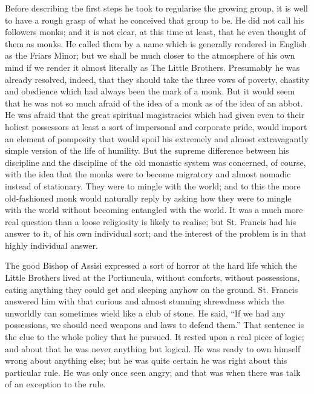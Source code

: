 \documentclass{book}
\begin{document}
Before describing the first steps he took to regularise the growing group, it is well to have a rough grasp of what he conceived that group to be. He did not call his followers monks; and it is not clear, at this time at least, that he even thought of them as monks. He called them by a name which is generally rendered in English as the Friars Minor; but we shall be much closer to the atmosphere of his own mind if we render it almost literally as The Little Brothers. Presumably he was already resolved, indeed, that they should take the three vows of poverty, chastity and obedience which had always been the mark of a monk. But it would seem that he was not so much afraid of the idea of a monk as of the idea of an abbot. He was afraid that the great spiritual magistracies which had given even to their holiest possessors at least a sort of impersonal and corporate pride, would import an element of pomposity that would spoil his extremely and almost extravagantly simple version of the life of humility. But the supreme difference between his discipline and the discipline of the old monastic system was concerned, of course, with the idea that the monks were to become migratory and almost nomadic instead of stationary. They were to mingle with the world; and to this the more old-fashioned monk would naturally reply by asking how they were to mingle with the world without becoming entangled with the world. It was a much more real question than a loose religiosity is likely to realise; but St. Francis had his answer to it, of his own individual sort; and the interest of the problem is in that highly individual answer.

The good Bishop of Assisi expressed a sort of horror at the hard life which the Little Brothers lived at the Portiuncula, without comforts, without possessions, eating anything they could get and sleeping anyhow on the ground. St. Francis answered him with that curious and almost stunning shrewdness which the unworldly can sometimes wield like a club of stone. He said, “If we had any possessions, we should need weapons and laws to defend them.” That sentence is the clue to the whole policy that he pursued. It rested upon a real piece of logic; and about that he was never anything but logical. He was ready to own himself wrong about anything else; but he was quite certain he was right about this particular rule. He was only once seen angry; and that was when there was talk of an exception to the rule.
\end{document}
